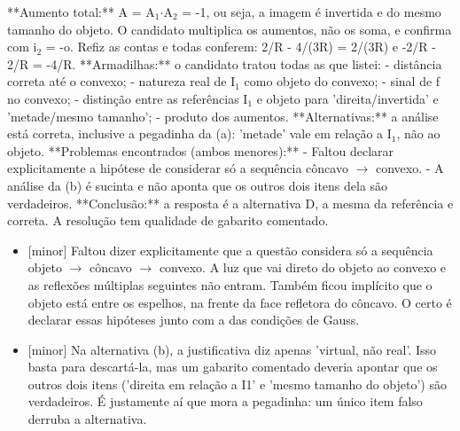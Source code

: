 \documentclass{article}%
\begin{document}
**Aumento total:** A = A$_{1}$$\cdot$A$_{2}$ = -1, ou seja, a imagem é invertida e do mesmo tamanho do objeto. O candidato multiplica os aumentos, não os soma, e confirma com i$_{2}$ = -o.\newline%
\newline%
Refiz as contas e todas conferem: 2/R - 4/(3R) = 2/(3R) e -2/R - 2/R = -4/R.\newline%
\newline%
**Armadilhas:** o candidato tratou todas as que listei:\newline%
{-} distância correta até o convexo;\newline%
{-} natureza real de I$_{1}$ como objeto do convexo;\newline%
{-} sinal de f no convexo;\newline%
{-} distinção entre as referências I$_{1}$ e objeto para 'direita/invertida' e 'metade/mesmo tamanho';\newline%
{-} produto dos aumentos.\newline%
\newline%
**Alternativas:** a análise está correta, inclusive a pegadinha da (a): 'metade' vale em relação a I$_{1}$, não ao objeto.\newline%
\newline%
**Problemas encontrados (ambos menores):**\newline%
{-} Faltou declarar explicitamente a hipótese de considerar só a sequência côncavo $\to$ convexo.\newline%
{-} A análise da (b) é sucinta e não aponta que os outros dois itens dela são verdadeiros.\newline%
\newline%
**Conclusão:** a resposta é a alternativa D, a mesma da referência e correta. A resolução tem qualidade de gabarito comentado.%
\begin{itemize}%
\item%
{[}minor{]} Faltou dizer explicitamente que a questão considera só a sequência objeto $\to$ côncavo $\to$ convexo. A luz que vai direto do objeto ao convexo e as reflexões múltiplas seguintes não entram. Também ficou implícito que o objeto está entre os espelhos, na frente da face refletora do côncavo. O certo é declarar essas hipóteses junto com a das condições de Gauss.%
\item%
{[}minor{]} Na alternativa (b), a justificativa diz apenas 'virtual, não real'. Isso basta para descartá{-}la, mas um gabarito comentado deveria apontar que os outros dois itens ('direita em relação a I1' e 'mesmo tamanho do objeto') são verdadeiros. É justamente aí que mora a pegadinha: um único item falso derruba a alternativa.%
\end{itemize}%
\end{document}
